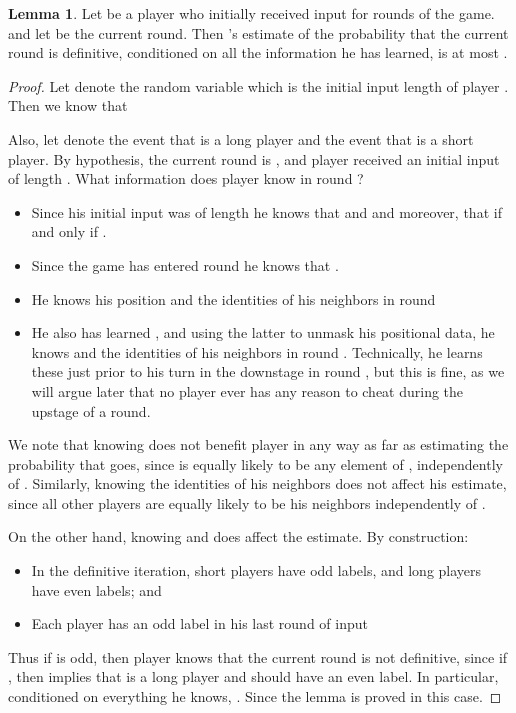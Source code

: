 \documentclass[12pt]{article}
\theoremstyle{definition}
\newtheorem{lemma}[theorem]{Lemma}
\begin{document}
\begin{lemma}\label{lem:guess}
Let  be a player who initially received input for  rounds of the game.
and let  be the current round. Then 's estimate of the 
probability that the current round is definitive, conditioned on all the 
information he has learned, is at most . 
\end{lemma}
\begin{proof}
\newcommand{\longp}{\mathcal{L}_j}
\newcommand{\shortp}{\mathcal{L}_j^{\mathrm{C}}}
Let  denote the random variable which is the initial input length of 
player . Then we know that 

Also, let  denote the event that  is a long player and 
 the event that  is a short player.  By hypothesis, 
the current round is , and player  received an initial input of 
length . What information does player  know in round ?
\begin{itemize}
\item Since his initial input was of length  he knows that  and  
 and moreover, that  if and only if .
\item Since the game has entered round  he knows that . 
\item He knows his position  and the identities of his neighbors 
in round 
\item He also has learned ,  and using the latter to unmask his 
positional data, he knows  and the identities of his neighbors
in round .  Technically, he learns these just prior to his turn in the 
downstage in round , but this is fine, as we will argue later that 
no player ever has any reason to cheat during the upstage of a round.
\end{itemize}

We note that knowing  does not benefit player  in any way as far as 
estimating the probability that  goes, since  is equally likely to 
be any element of , independently of . Similarly, knowing the 
identities of his neighbors 
does not affect his estimate, since all other players are equally likely to 
be his neighbors independently of . 

On the other hand, knowing  and  does affect the 
estimate. By construction:
\begin{itemize}
\item In the definitive iteration, short players have odd labels, and 
long players have even labels; and
\item Each player has an odd label in his last round of input 
\end{itemize}
Thus if  is odd, then player  knows that the current round is not
definitive, since if , then  implies that  is a long player 
and should have an even label.  In particular, conditioned on everything he knows, 
. Since  the lemma is proved in this case.


\end{proof}
\end{document}
